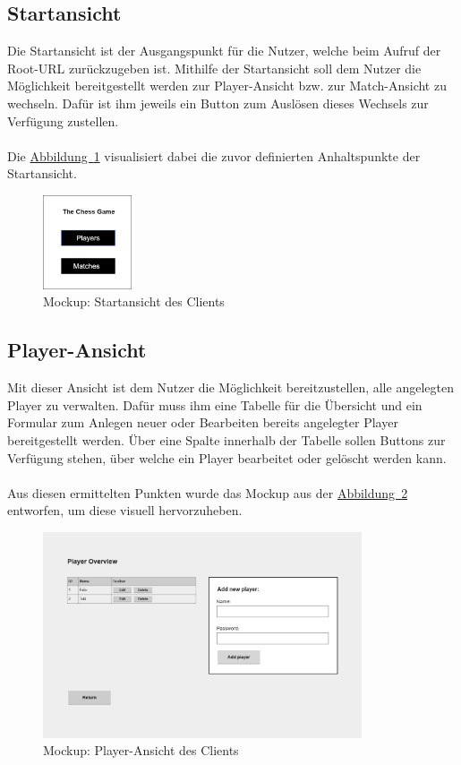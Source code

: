 \subsection{Startansicht}\label{sec:startView}
Die Startansicht ist der Ausgangspunkt für die Nutzer, welche beim Aufruf der Root-\gls{URL} zurückzugeben ist. Mithilfe der Startansicht soll dem Nutzer die Möglichkeit bereitgestellt werden zur Player-Ansicht bzw. zur Match-Ansicht zu wechseln. Dafür ist ihm jeweils ein Button zum Auslösen dieses Wechsels zur Verfügung zustellen.\\
\\
Die \hyperref[fig:startView]{Abbildung~\ref{fig:startView}} visualisiert dabei die zuvor definierten Anhaltspunkte der Startansicht.
\begin{figure}[htb]
	\includegraphics[width=0.234\textwidth]{images/start-view.png}
	\caption{Mockup: Startansicht des Clients}
	\label{fig:startView}
\end{figure}

\subsection{Player-Ansicht}\label{sec:playerView}
Mit dieser Ansicht ist dem Nutzer die Möglichkeit bereitzustellen, alle angelegten Player zu verwalten. Dafür muss ihm eine Tabelle für die Übersicht und ein Formular zum Anlegen neuer oder Bearbeiten bereits angelegter Player bereitgestellt werden. Über eine Spalte innerhalb der Tabelle sollen Buttons zur Verfügung stehen, über welche ein Player bearbeitet oder gelöscht werden kann.\\
\\
Aus diesen ermittelten Punkten wurde das Mockup aus der \hyperref[fig:playerView]{Abbildung~\ref{fig:playerView}} entworfen, um diese visuell hervorzuheben.
\begin{figure}[htb]
	\includegraphics[width=0.84\textwidth]{images/player-view.png}
	\caption{Mockup: Player-Ansicht des Clients}
	\label{fig:playerView}
\end{figure}

